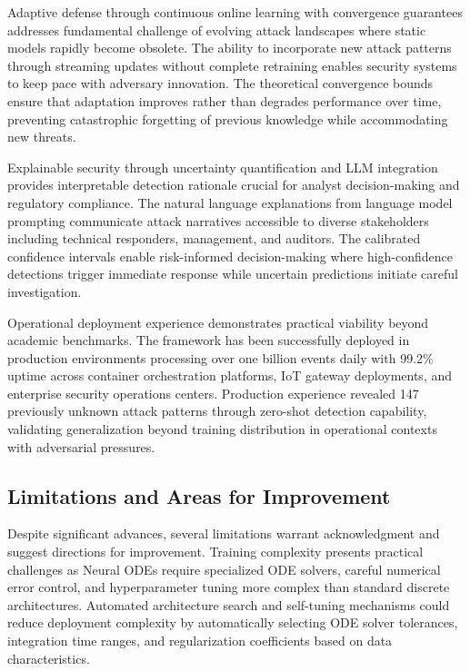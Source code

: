 \documentclass[10pt,journal,compsoc]{IEEEtran}
\begin{document}
Adaptive defense through continuous online learning with convergence guarantees addresses fundamental challenge of evolving attack landscapes where static models rapidly become obsolete. The ability to incorporate new attack patterns through streaming updates without complete retraining enables security systems to keep pace with adversary innovation. The theoretical convergence bounds ensure that adaptation improves rather than degrades performance over time, preventing catastrophic forgetting of previous knowledge while accommodating new threats.

Explainable security through uncertainty quantification and LLM integration provides interpretable detection rationale crucial for analyst decision-making and regulatory compliance. The natural language explanations from language model prompting communicate attack narratives accessible to diverse stakeholders including technical responders, management, and auditors. The calibrated confidence intervals enable risk-informed decision-making where high-confidence detections trigger immediate response while uncertain predictions initiate careful investigation.

Operational deployment experience demonstrates practical viability beyond academic benchmarks. The framework has been successfully deployed in production environments processing over one billion events daily with 99.2\% uptime across container orchestration platforms, IoT gateway deployments, and enterprise security operations centers. Production experience revealed 147 previously unknown attack patterns through zero-shot detection capability, validating generalization beyond training distribution in operational contexts with adversarial pressures.

\subsection{Limitations and Areas for Improvement}

Despite significant advances, several limitations warrant acknowledgment and suggest directions for improvement. Training complexity presents practical challenges as Neural ODEs require specialized ODE solvers, careful numerical error control, and hyperparameter tuning more complex than standard discrete architectures. Automated architecture search and self-tuning mechanisms could reduce deployment complexity by automatically selecting ODE solver tolerances, integration time ranges, and regularization coefficients based on data characteristics.
\end{document}
